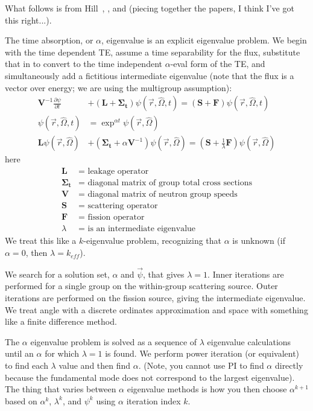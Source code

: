\documentclass[12pt,twoside]{article}
\newcommand{\vOmega}{\ensuremath{\hat{\Omega}}}
\newcommand{\ve}[1]{\ensuremath{\mathbf{#1}}}
\begin{document}
What follows is from Hill~\cite{Hill1983}, \cite{Dahl2006}, and \cite{Shen2015} (piecing together the papers, I think I've got this right...).

The time absorption, or $\alpha$, eigenvalue is an explicit eigenvalue problem. 
We begin with the time dependent TE, assume a time separability for the flux, substitute that in to convert to the time independent $\alpha$-eval form of the TE, and simultaneously add a fictitious intermediate eigenvalue (note that the flux is a vector over energy; we are using the multigroup assumption):
\begin{align*}
\ve{V}^{-1} \frac{\partial \psi}{\partial t} &+ (\ve{L} + \ve{\Sigma_t}) \psi(\vec{r}, \vOmega, t) = (\ve{S} + \ve{F})\psi(\vec{r}, \vOmega, t)\\
\psi(\vec{r}, \vOmega, t) &= \exp^{\alpha t} \psi(\vec{r}, \vOmega)\\
%
\ve{L} \psi(\vec{r}, \vOmega) &+ (\ve{\Sigma_t} + \alpha \ve{V}^{-1}) \psi(\vec{r}, \vOmega) = (\ve{S} + \frac{1}{\lambda}\ve{F}) \psi(\vec{r}, \vOmega)
\end{align*}
%
here
\begin{align*}
\ve{L} &=\text{ leakage operator}\\
\ve{\Sigma_t} &=\text{ diagonal matrix of group total cross sections}\\
\ve{V} &=\text{ diagonal matrix of neutron group speeds}\\
\ve{S} &=\text{ scattering operator}\\
\ve{F} &=\text{ fission operator}\\
\lambda &=\text{ is an intermediate eigenvalue}
\end{align*}
We treat this like a $k$-eigenvalue problem, recognizing that $\alpha$ is unknown (if $\alpha=0$, then $\lambda = k_{eff}$). 

We search for a solution set, $\alpha$ and $\vec{\psi}$, that gives $\lambda = 1$.
Inner iterations are performed for a single group on the within-group scattering source.
Outer iterations are performed on the fission source, giving the intermediate eigenvalue.
We treat angle with a discrete ordinates approximation and space with something like a finite difference method. 

The $\alpha$ eigenvalue problem is solved as a sequence of $\lambda$ eigenvalue calculations until an $\alpha$ for which $\lambda = 1$ is found. 
We perform power iteration (or equivalent) to find each $\lambda$ value and then find $\alpha$. 
(Note, you cannot use PI to find $\alpha$ directly because the fundamental mode does not correspond to the largest eigenvalue).
The thing that varies between $\alpha$ eigenvalue methods is how you then choose $\alpha^{k+1}$ based on $\alpha^k$, $\lambda^k$, and $\psi^k$ using $\alpha$ iteration index $k$.
\end{document}
